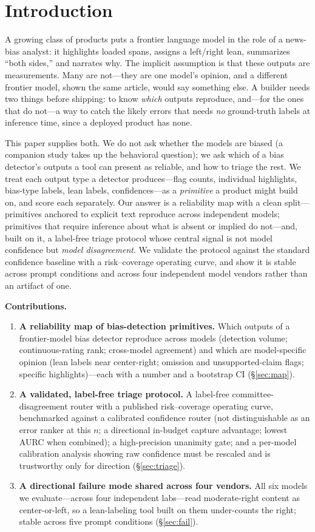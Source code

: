 \documentclass{article}
\begin{document}
\section{Introduction}
A growing class of products puts a frontier language model in the role
of a news-bias analyst: it highlights loaded spans, assigns a
left/right lean, summarizes ``both sides,'' and narrates why. The
implicit assumption is that these outputs are measurements. Many are
not---they are one model's opinion, and a different frontier model,
shown the same article, would say something else. A builder needs two
things before shipping: to know \emph{which} outputs reproduce, and---for
the ones that do not---a way to catch the likely errors that needs
\emph{no} ground-truth labels at inference time, since a deployed
product has none.

This paper supplies both. We do not ask whether the models are biased (a
companion study takes up the behavioral question); we ask which of a
bias detector's outputs a tool can present as reliable, and how to
triage the rest. We treat each output type a detector produces---flag
counts, individual highlights, bias-type labels, lean labels,
confidences---as a \emph{primitive} a product might build on, and score
each separately. Our answer is a reliability map with a clean split---
primitives anchored to explicit text reproduce across independent
models; primitives that require inference about what is absent or
implied do not---and, built on it, a label-free triage protocol whose
central signal is not model confidence but \emph{model disagreement}. We
validate the protocol against the standard confidence baseline with a
risk--coverage operating curve, and show it is stable across prompt
conditions and across four independent model vendors rather than an
artifact of one.

\textbf{Contributions.}
\begin{enumerate}
  \item \textbf{A reliability map of bias-detection primitives.} Which
  outputs of a frontier-model bias detector reproduce across models
  (detection volume; continuous-rating rank; cross-model agreement) and
  which are model-specific opinion (lean labels near center-right;
  omission and unsupported-claim flags; specific highlights)---each with a number
  and a bootstrap CI (\S\ref{sec:map}).
  \item \textbf{A validated, label-free triage protocol.} A label-free
  committee-disagreement router with a published risk--coverage operating
  curve, benchmarked against a calibrated confidence router (not
  distinguishable as an error ranker at this $n$; a directional
  in-budget capture advantage; lowest AURC when combined); a high-precision unanimity
  gate; and a per-model calibration analysis showing raw confidence must
  be rescaled and is trustworthy only for direction (\S\ref{sec:triage}).
  \item \textbf{A directional failure mode shared across four vendors.}
  All six models we evaluate---across four independent labs---read
  moderate-right content as center-or-left, so a lean-labeling tool built
  on them under-counts the right; stable across five prompt conditions
  (\S\ref{sec:fail}).
\end{enumerate}
\end{document}
